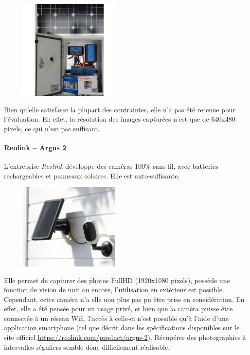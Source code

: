 \begin{figure}[ht]
    \includegraphics[width=50mm]{img/conception/electrosun_cam.jpg}
    \centering
\end{figure}

Bien qu'elle satisfasse la plupart des contraintes, elle n'a pas été retenue pour l'évaluation. En effet, la résolution des images capturées n'est que de 640x480 pixels, ce qui n'est pas suffisant.

\paragraph{\textbf{Reolink} -- Argus 2}
L'entreprise \textit{Reolink} développe des caméras 100\% sans fil, avec batteries rechargeables et panneaux solaires. Elle est auto-suffisante.\autocite{cam:argus2}

\begin{figure}[ht]
    \includegraphics[width=50mm]{img/conception/argus2_cam.jpg}
    \centering
\end{figure}

Elle permet de capturer des photos FullHD (1920x1080 pixels), possède une fonction de vision de nuit ou encore, l'utilisation en extérieur est possible. Cependant, cette caméra n'a elle non plus pas pu être prise en considération. En effet, elle a été pensée pour un usage privé, et bien que la caméra puisse être connectée à un réseau Wifi, l'accès à celle-ci n'est possible qu'à l'aide d'une application smartphone (tel que décrit dans les spécifications disponibles sur le site officiel \url{https://reolink.com/product/argus-2}\autocite{cam:argus2}). Récupérer des photographies à intervalles réguliers semble donc difficilement réalisable.

